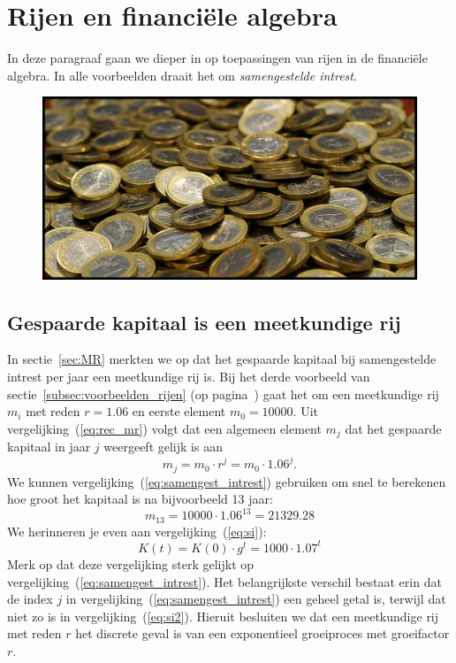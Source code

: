 \section{Rijen en financi\"{e}le algebra}
In deze paragraaf gaan we dieper in op toepassingen van rijen in de
financi\"{e}le algebra. In alle voorbeelden draait het om \textit{samengestelde intrest}.
\begin{figure}[h]
\begin{center}
\includegraphics[trim=0.2cm 1.5cm 0.2cm 1.5cm,clip,width=\textwidth]{figuren/rijen/geldstukken.jpg}
\end{center}
\end{figure}



\subsection{Gespaarde kapitaal is een meetkundige rij}
In sectie~\ref{sec:MR}  merkten we op dat het gespaarde kapitaal bij samengestelde intrest per jaar een meetkundige rij is. Bij het derde voorbeeld van sectie~\ref{subsec:voorbeelden_rijen} (op pagina~\pageref{subsec:voorbeelden_rijen}) gaat het om  een meetkundige rij $m_i$ met reden $r=\num{1.06}$ en eerste element $m_0=\num{10000}$. Uit vergelijking~(\ref{eq:rec_mr}) volgt dat een algemeen element $m_j$ dat het gespaarde kapitaal in jaar $j$ weergeeft gelijk is aan 
\begin{equation}
m_j=m_0\cdot r^j=m_0\cdot\num{1.06}^j.
\label{eq:samengest_intrest}
\end{equation}  
We kunnen vergelijking~(\ref{eq:samengest_intrest}) gebruiken om snel te berekenen hoe groot het kapitaal is na bijvoorbeeld 13 jaar:
\[
m_{13}=\num{10000}\cdot\num{1.06}^{13}=\num{21329,28}
\]
We herinneren je even aan vergelijking~(\ref{eq:si}):
\begin{equation}
     K(t)=K(0)\cdot g^{t}=1000\cdot \num{1.07}^{t}
    \label{eq:si2}
\end{equation}
Merk op dat deze vergelijking sterk gelijkt op vergelijking~(\ref{eq:samengest_intrest}). Het belangrijkste verschil bestaat erin dat de index $j$ in vergelijking~(\ref{eq:samengest_intrest}) een geheel getal is, terwijl dat niet zo is in vergelijking~(\ref{eq:si2}). Hieruit besluiten we dat een meetkundige rij met reden $r$ het discrete geval is van een exponentieel groeiproces met groeifactor $r$. 


